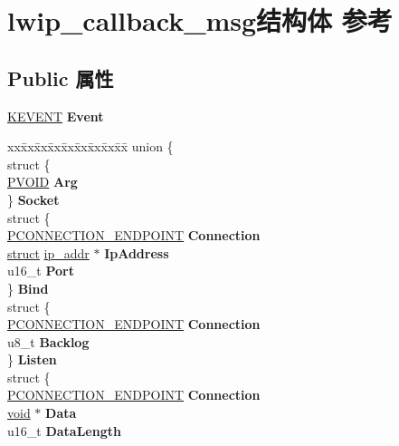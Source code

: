 \hypertarget{structlwip__callback__msg}{}\section{lwip\+\_\+callback\+\_\+msg结构体 参考}
\label{structlwip__callback__msg}
\subsection*{Public 属性}
\begin{DoxyCompactItemize}
\item 
\mbox{\label{structlwip__callback__msg_a7022c4374dc9a151f520b9949f7daf27}} 
\hyperlink{struct___k_e_v_e_n_t}{K\+E\+V\+E\+NT} {\bfseries Event}
\item 
\mbox{\label{structlwip__callback__msg_a217bdc683d11e0be66daa36a27ad7b6b}} 
\begin{tabbing}
xx\=xx\=xx\=xx\=xx\=xx\=xx\=xx\=xx\=\kill
union \{\\
\>struct \{\\
\>\>\hyperlink{interfacevoid}{PVOID} {\bfseries Arg}\\
\>\} {\bfseries Socket}\\
\>struct \{\\
\>\>\hyperlink{struct___c_o_n_n_e_c_t_i_o_n___e_n_d_p_o_i_n_t}{PCONNECTION\_ENDPOINT} {\bfseries Connection}\\
\>\>\hyperlink{interfacestruct}{struct} \hyperlink{structip__addr}{ip\_addr} $\ast$ {\bfseries IpAddress}\\
\>\>u16\_t {\bfseries Port}\\
\>\} {\bfseries Bind}\\
\>struct \{\\
\>\>\hyperlink{struct___c_o_n_n_e_c_t_i_o_n___e_n_d_p_o_i_n_t}{PCONNECTION\_ENDPOINT} {\bfseries Connection}\\
\>\>u8\_t {\bfseries Backlog}\\
\>\} {\bfseries Listen}\\
\>struct \{\\
\>\>\hyperlink{struct___c_o_n_n_e_c_t_i_o_n___e_n_d_p_o_i_n_t}{PCONNECTION\_ENDPOINT} {\bfseries Connection}\\
\>\>\hyperlink{interfacevoid}{void} $\ast$ {\bfseries Data}\\
\>\>u16\_t {\bfseries DataLength}\\

\end{tabbing}
\end{DoxyCompactItemize}
